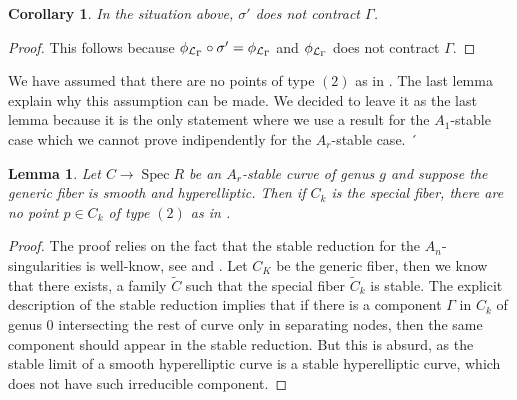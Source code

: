 \documentclass{alggeom}
\numberwithin{equation}{section}
\numberwithin{subsection}{section}
\newtheorem{corollary}[theorem]{Corollary}
\newtheorem{lemma}[theorem]{Lemma}
\theoremstyle{definition}
\theoremstyle{remark}
\newcommand\spec{\operatorname{Spec}}
\begin{document}
\begin{corollary}
 In the situation above, $\sigma'$ does not contract $\Gamma$.
\end{corollary}

\begin{proof}
 This follows because $\phi_{\mathcal{L}_{\Gamma}} \circ \sigma' = \phi_{\mathcal{L}_{\Gamma}}$ and $\phi_{\mathcal{L}_{\Gamma}}$ does not contract $\Gamma$.
\end{proof}
 

	We have assumed that there are no points of type $(2)$ as in . The last lemma explain why this assumption can be made. We decided to leave it as the last lemma because it is the only statement where we use a result for the $A_1$-stable case which we cannot prove indipendently for the $A_r$-stable case. ´
	
	\begin{lemma}\label{lem:not-poss-comp}
		Let $C\rightarrow \spec R$ be an $A_r$-stable curve of genus $g$ and suppose the generic fiber is smooth and hyperelliptic. Then if $C_k$ is the special fiber, there are no point $p\in C_k$ of type $(2)$ as in . 
	\end{lemma}
\begin{proof} 
	The proof relies on the fact that the stable reduction for the $A_n$-singularities is well-know, see \cite{Hass} and \cite{CasMarLaz}. Let $C_K$ be the generic fiber, then we know that there exists, a family $\widetilde{C}$ such that the special fiber $\widetilde{C}_k$ is stable. The explicit description of the stable reduction implies that if there is a component $\Gamma$ in $C_k$ of genus $0$ intersecting the rest of curve only in separating nodes, then the same component should appear in the stable reduction. But this is absurd, as the stable limit of a smooth hyperelliptic curve is a stable hyperelliptic curve, which does not have such irreducible component.
\end{proof}









\end{document}
